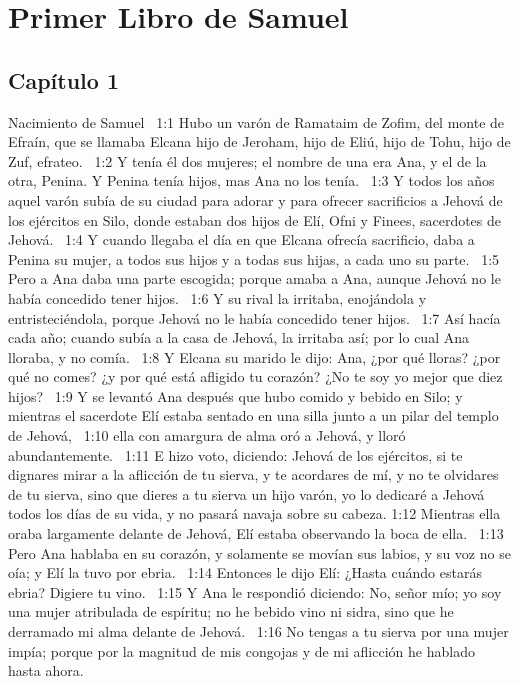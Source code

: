 
\chapter{Primer Libro de Samuel}

\section*{Capítulo 1 }
Nacimiento de Samuel  
1:1 Hubo un varón de Ramataim de Zofim, del monte de Efraín, que se llamaba Elcana hijo de Jeroham, hijo de Eliú, hijo de Tohu, hijo de Zuf, efrateo.  
1:2 Y tenía él dos mujeres; el nombre de una era Ana, y el de la otra, Penina. Y Penina tenía hijos, mas Ana no los tenía.  
1:3 Y todos los años aquel varón subía de su ciudad para adorar y para ofrecer sacrificios a Jehová de los ejércitos en Silo, donde estaban dos hijos de Elí, Ofni y Finees, sacerdotes de Jehová.  
1:4 Y cuando llegaba el día en que Elcana ofrecía sacrificio, daba a Penina su mujer, a todos sus hijos y a todas sus hijas, a cada uno su parte.  
1:5 Pero a Ana daba una parte escogida; porque amaba a Ana, aunque Jehová no le había concedido tener hijos.  
1:6 Y su rival la irritaba, enojándola y entristeciéndola, porque Jehová no le había concedido tener hijos.  
1:7 Así hacía cada año; cuando subía a la casa de Jehová, la irritaba así; por lo cual Ana lloraba, y no comía.  
1:8 Y Elcana su marido le dijo: Ana, ¿por qué lloras? ¿por qué no comes? ¿y por qué está afligido tu corazón? ¿No te soy yo mejor que diez hijos?  
1:9 Y se levantó Ana después que hubo comido y bebido en Silo; y mientras el sacerdote Elí estaba sentado en una silla junto a un pilar del templo de Jehová,  
1:10 ella con amargura de alma oró a Jehová, y lloró abundantemente.  
1:11 E hizo voto, diciendo: Jehová de los ejércitos, si te dignares mirar a la aflicción de tu sierva, y te acordares de mí, y no te olvidares de tu sierva, sino que dieres a tu sierva un hijo varón, yo lo dedicaré a Jehová todos los días de su vida, y no pasará navaja sobre su cabeza. 
1:12 Mientras ella oraba largamente delante de Jehová, Elí estaba observando la boca de ella.  
1:13 Pero Ana hablaba en su corazón, y solamente se movían sus labios, y su voz no se oía; y Elí la tuvo por ebria.  
1:14 Entonces le dijo Elí: ¿Hasta cuándo estarás ebria? Digiere tu vino.  
1:15 Y Ana le respondió diciendo: No, señor mío; yo soy una mujer atribulada de espíritu; no he bebido vino ni sidra, sino que he derramado mi alma delante de Jehová.  
1:16 No tengas a tu sierva por una mujer impía; porque por la magnitud de mis congojas y de mi aflicción he hablado hasta ahora.  
